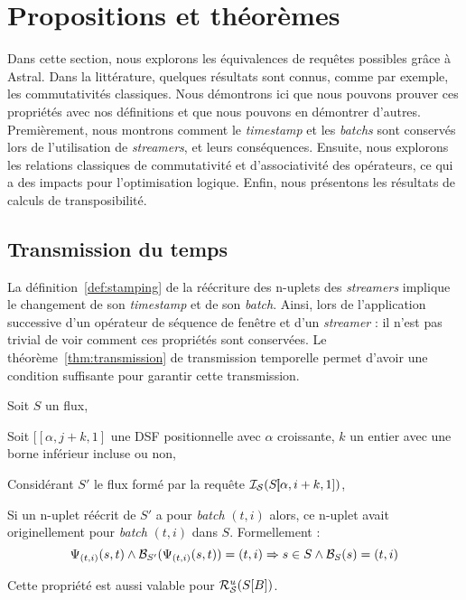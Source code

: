 \section{Propositions et théorèmes}\label{sec:valid:expressivite:theoremes}
Dans cette section, nous explorons les équivalences de requêtes possibles grâce à Astral. Dans la littérature, quelques résultats sont connus, comme par exemple, les commutativités classiques. Nous démontrons ici que nous pouvons prouver ces propriétés avec nos définitions et que nous pouvons en démontrer d'autres. Premièrement, nous montrons comment le \textit{timestamp} et les \textit{batchs} sont conservés lors de l'utilisation de \textit{streamers}, et leurs conséquences. Ensuite, nous explorons les relations classiques de commutativité et d'associativité des opérateurs, ce qui a des impacts pour l'optimisation logique. Enfin, nous présentons les résultats de calculs de transposibilité.

\subsection{Transmission du temps}
La définition~\ref{def:stamping} de la réécriture des n-uplets des \textit{streamers} implique le changement de son \textit{timestamp} et de son \textit{batch}. Ainsi, lors de l'application successive d'un opérateur de séquence de fenêtre et d'un \textit{streamer} : il n'est pas trivial de voir comment ces propriétés sont conservées. Le théorème~\ref{thm:transmission} de transmission temporelle permet d'avoir une condition suffisante pour garantir cette transmission.

\begin{thm}\label{thm:transmission}
    Soit $S$ un flux,

    Soit $[\!\![\alpha,j+k,1]$ une DSF positionnelle avec $\alpha$ croissante, $k$ un entier avec une borne inférieur incluse ou non,

    Considérant $S'$ le flux formé par la requête $\mathcal{I_S}(S]\!\![\alpha,i+k,1])$,

    Si un n-uplet réécrit de $S'$ a pour \textit{batch} $(t,i)$ alors, ce n-uplet avait originellement pour \textit{batch} $(t,i)$ dans $S$. Formellement :
$$\Psi_{(t,i)}(s,t) \wedge \mathcal{B}_{S'}(\Psi_{(t,i)}(s,t)) = (t,i) \Rightarrow s\in S \wedge \mathcal{B}_S(s) = (t,i)$$

    Cette propriété est aussi valable pour $\mathcal{R}_{\mathcal S}^{u}(S[B])$.
\end{thm}

